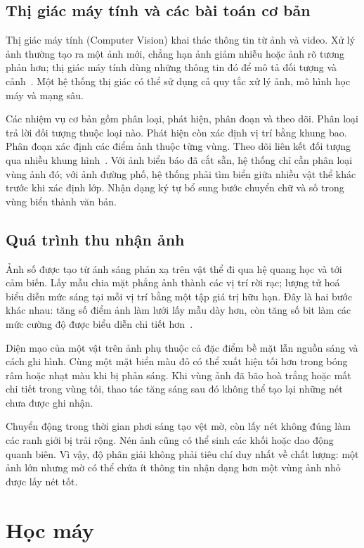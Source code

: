 \subsection{Thị giác máy tính và các bài toán cơ bản}
Thị giác máy tính (Computer Vision) khai thác thông tin từ ảnh và video. Xử lý ảnh thường tạo ra một ảnh mới, chẳng hạn ảnh giảm nhiễu hoặc ảnh rõ tương phản hơn; thị giác máy tính dùng những thông tin đó để mô tả đối tượng và cảnh~\cite{tailieu_bai1}. Một hệ thống thị giác có thể sử dụng cả quy tắc xử lý ảnh, mô hình học máy và mạng sâu.

Các nhiệm vụ cơ bản gồm phân loại, phát hiện, phân đoạn và theo dõi. Phân loại trả lời đối tượng thuộc loại nào. Phát hiện còn xác định vị trí bằng khung bao. Phân đoạn xác định các điểm ảnh thuộc từng vùng. Theo dõi liên kết đối tượng qua nhiều khung hình~\cite{szeliski2022vision}. Với ảnh biển báo đã cắt sẵn, hệ thống chỉ cần phân loại vùng ảnh đó; với ảnh đường phố, hệ thống phải tìm biển giữa nhiều vật thể khác trước khi xác định lớp. Nhận dạng ký tự bổ sung bước chuyển chữ và số trong vùng biển thành văn bản.

\subsection{Quá trình thu nhận ảnh}
Ảnh số được tạo từ ánh sáng phản xạ trên vật thể đi qua hệ quang học và tới cảm biến. Lấy mẫu chia mặt phẳng ảnh thành các vị trí rời rạc; lượng tử hoá biểu diễn mức sáng tại mỗi vị trí bằng một tập giá trị hữu hạn. Đây là hai bước khác nhau: tăng số điểm ảnh làm lưới lấy mẫu dày hơn, còn tăng số bit làm các mức cường độ được biểu diễn chi tiết hơn~\cite{tailieu_bai1}.

Diện mạo của một vật trên ảnh phụ thuộc cả đặc điểm bề mặt lẫn nguồn sáng và cách ghi hình. Cùng một mặt biển màu đỏ có thể xuất hiện tối hơn trong bóng râm hoặc nhạt màu khi bị phản sáng. Khi vùng ảnh đã bão hoà trắng hoặc mất chi tiết trong vùng tối, thao tác tăng sáng sau đó không thể tạo lại những nét chưa được ghi nhận.

Chuyển động trong thời gian phơi sáng tạo vệt mờ, còn lấy nét không đúng làm các ranh giới bị trải rộng. Nén ảnh cũng có thể sinh các khối hoặc dao động quanh biên. Vì vậy, độ phân giải không phải tiêu chí duy nhất về chất lượng: một ảnh lớn nhưng mờ có thể chứa ít thông tin nhận dạng hơn một vùng ảnh nhỏ được lấy nét tốt.

\section{Học máy}
